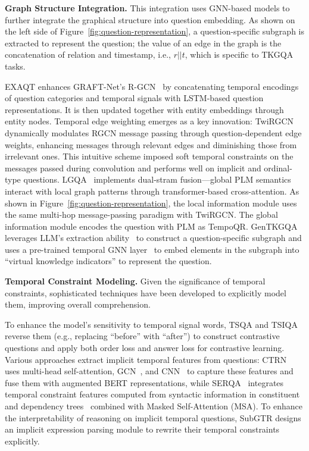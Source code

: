 {\textbf{Graph Structure Integration.} This integration uses GNN-based models to further integrate the graphical structure into question embedding. As shown on the left side of Figure~\ref{fig:question-representation}, a question-specific subgraph is extracted to represent the question; the value of an edge in the graph is the concatenation of relation and timestamp, i.e., $r || t$, which is specific to TKGQA tasks. 

EXAQT enhances GRAFT-Net's R-GCN~\cite{sunOpenDomainQuestion2018} by concatenating temporal encodings of question categories and temporal signals with LSTM-based question representations. It is then updated together with entity embeddings through entity nodes. 
Temporal edge weighting emerges as a key innovation: TwiRGCN~\cite{sharmaTwiRGCNTemporallyWeighted2023} dynamically modulates RGCN message passing through question-dependent edge weights, enhancing messages through relevant edges and diminishing those from irrelevant ones. This intuitive scheme imposed soft temporal constraints on the messages passed during convolution and performs well on implicit and ordinal-type questions.
LGQA~\cite{liuLocalGlobalTemporal2023} implements dual-stram fusion—global PLM semantics interact with local graph patterns through transformer-based cross-attention. 
As shown in Figure~\ref {fig:question-representation},
the local information module uses the same multi-hop message-passing paradigm with TwiRGCN. 
The global information module encodes the question with PLM as TempoQR.
GenTKGQA~\cite{gaoTwostageGenerativeQuestion2024} leverages LLM’s extraction ability~\cite{sunChatGPTGoodSearch2023} to construct a question-specific subgraph and uses a pre-trained temporal GNN layer~\cite{velickovicGraphAttentionNetworks2018} to embed elements in the subgraph into ``virtual knowledge indicators'' to represent the question.


\textbf{Temporal Constraint Modeling.} Given the significance of temporal constraints, sophisticated techniques have been developed to explicitly model them, improving overall comprehension.

To enhance the model's sensitivity to temporal signal words, TSQA and TSIQA reverse them (e.g., replacing ``before'' with ``after'') to construct contrastive questions and apply both order loss and answer loss for contrastive learning.
Various approaches extract implicit temporal features from questions: CTRN~\cite{jiaoImprovingReasoningNetwork2023} uses multi-head self-attention, GCN~\cite{sunOpenDomainQuestion2018}, and CNN~\cite{potaBestPracticesConvolutional2020} to capture these features and fuse them with augmented BERT representations, while SERQA~\cite{duSemanticenhancedReasoningQuestion2024} integrates temporal constraint features computed from syntactic information in constituent and dependency trees~\cite{sunReorderThenParse2022, zhangFastAccurateNeural2020, wangModelingMultipleLatent2023, liangBiSynGATBiSyntaxAware2022} combined with Masked Self-Attention (MSA). 
To enhance the interpretability of reasoning on implicit temporal questions, SubGTR designs an implicit expression parsing module to rewrite their temporal constraints explicitly. 

}
